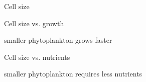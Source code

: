 \documentclass{beamer}
\begin{document}
\begin{frame}{Cell size}



\end{frame}
\begin{frame}{Cell size vs. growth}


\begin{center}
\alert{smaller phytoplankton grows faster}
\end{center}


\end{frame}
\begin{frame}{Cell size vs. nutrients}


\begin{center}
\alert{smaller phytoplankton requires less nutrients}
\end{center}


\end{frame}
\end{document}

